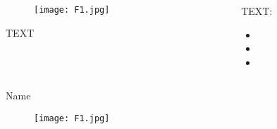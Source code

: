 \begin{frame}\frametitle{}
\begin{minipage}[0.4\textheight]{\textwidth}
\begin{columns}[T]
\begin{column}{0.5\textwidth}
\vspace{2em}
\begin{figure}[H]
	\centering
		\texttt{[image: F1.jpg]}
\end{figure}
\small{TEXT}
\end{column}
\begin{column}{0.5\textwidth}
\vspace{2em} 
TEXT: 
\begin{itemize}
	\item 
	\item
	\item
\end{itemize}
\end{column}
\end{columns}
\end{minipage}
\end{frame}


\begin{frame}{Name}
\begin{figure}[H]
	\centering
		\texttt{[image: F1.jpg]}
\end{figure}
\end{frame}

\begin{figure}[H]
	\centering
			\hspace{5mm}
\end{figure}




